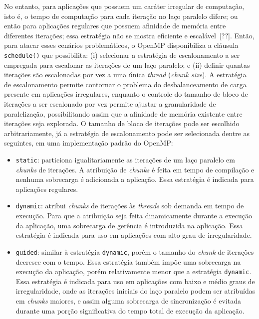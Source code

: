 \documentclass{SBCbookchapter}
\begin{document}
		
		No entanto, para aplicações que possuem um caráter irregular de
		computação, isto é, o tempo de computação para cada iteração no laço
		paralelo difere; ou então para aplicações regulares que possuem
		afinidade de memória entre diferentes iterações; essa estratégia não
		se mostra eficiente e escalável~[??]. Então, para atacar esses
		cenários problemáticos, o OpenMP disponibiliza a cláusula
		\texttt{schedule()} que possibilita: (i) selecionar a estratégia de
		escalonamento a ser empregada para escalonar as
		iterações de um laço paralelo; e (ii) definir quantas iterações são
		escalonadas por vez a uma única \textit{thread} (\textit{chunk size}).
		A estratégia de escalonamento permite contornar o problema do
		desbalanceamento de carga presente em aplicações irregulares,
		enquanto o controle do tamanho de bloco de iterações a ser escalonado
		por vez permite ajustar a granularidade de paralelização, possibilitando
		assim que a afinidade de memória existente entre iterações seja explorada.
		O tamanho de bloco de iterações pode ser escolhido arbitrariamente,
		já a estratégia de escalonamento pode ser selecionada dentre as
		seguintes, em uma implementação padrão do OpenMP:
		\begin{itemize}
			\item \texttt{static}: particiona igualitariamente as iterações de um
			laço paralelo em \textit{chunks} de iterações. A atribuição de \textit{chunks}
			é feita em tempo de compilação e nenhuma sobrecarga é
			adicionada a aplicação. Essa estratégia é indicada para
			aplicações regulares.
			
			\item \texttt{dynamic}: atribui \textit{chunks} de iterações às \textit{threads} sob
			demanda em tempo de execução. Para que a atribuição seja feita
			dinamicamente durante a execução da aplicação, uma sobrecarga de
			gerência é introduzida na aplicação. Essa estratégia é indicada
			para uso em aplicações com alto grau de irregularidade.

			\item \texttt{guided}: similar à estratégia \texttt{dynamic}, porém o tamanho do
			\textit{chunk} de iterações decresce com o tempo. Essa estratégia
			também impõe uma sobrecarga na execução da aplicação, porém
			relativamente menor que a estratégia \texttt{dynamic}. Essa
			estratégia é indicada para uso em aplicações com baixo e
			médio graus de irregularidade, onde as iterações iniciais
			do laço paralelo podem ser atribuídas em \textit{chunks} maiores, e
			assim alguma sobrecarga de sincronização é evitada durante uma porção
			significativa do tempo total de execução da aplicação.
		\end{itemize}
		
\end{document}
